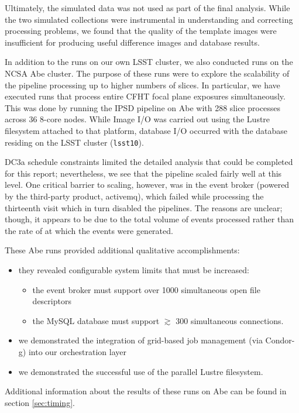 Ultimately, the simulated data was not used as part of the final
analysis.  While the two simulated collections were instrumental
in understanding and correcting processing problems, we found that the
quality of the template images were insufficient for producing useful
difference images and database results.  

In addition to the runs on our own LSST cluster, we also conducted
runs on the NCSA Abe cluster.  The purpose of these runs were to
explore the scalability of the pipeline processing up to higher
numbers of slices.  In particular, we have executed runs that process
entire CFHT focal plane exposures simultaneously.  This was done by
running the IPSD pipeline on Abe with 288 slice processes across 36
8-core nodes.  While Image I/O was carried out using the Lustre
filesystem attached to that platform, database I/O occurred with the
database residing on the LSST cluster ({\tt lsst10}).  

DC3a schedule constraints limited the detailed analysis
that could be completed for this report; nevertheless, we see that the
pipeline scaled fairly well at this level.  One critical barrier to
scaling, however, was in the event broker (powered by the
third-party product, activemq), which failed while processing the
thirteenth visit which in turn disabled the pipelines.  The reasons
are unclear; though, it appears to be due to the total volume of
events processed rather than the rate of at which the events were
generated.  

These Abe runs provided additional qualitative accomplishments:

\begin{itemize}
\item they revealed configurable system limits that must be increased:
\begin{itemize}
\item the event broker must support over 1000 simultaneous open file
  descriptors 
\item the MySQL database must support $\gtrsim$ 300 simultaneous
  connections.  
\end{itemize}
\item we demonstrated the integration of grid-based job management
  (via Condor-g) into our orchestration layer
\item we demonstrated the successful use of the parallel Lustre
  filesystem.  
\end{itemize}

\noindent Additional information about the results of these runs on
Abe can be found in section \ref{sec:timing}.  

